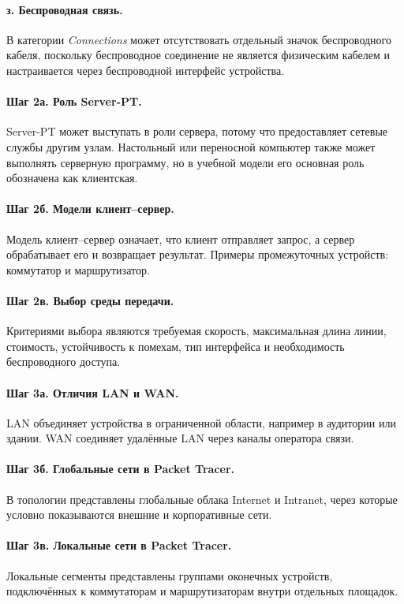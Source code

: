 \documentclass[a4paper,14pt,oneside]{extarticle}
\begin{document}
\paragraph{з. Беспроводная связь.}
В категории \textit{Connections} может отсутствовать отдельный значок
беспроводного кабеля, поскольку беспроводное соединение не является
физическим кабелем и настраивается через беспроводной интерфейс устройства.

\paragraph{Шаг 2а. Роль Server-PT.}
Server-PT может выступать в роли сервера, потому что предоставляет
сетевые службы другим узлам. Настольный или переносной компьютер также
может выполнять серверную программу, но в учебной модели его основная
роль обозначена как клиентская.

\paragraph{Шаг 2б. Модели клиент--сервер.}
Модель клиент--сервер означает, что клиент отправляет запрос, а сервер
обрабатывает его и возвращает результат. Примеры промежуточных устройств:
коммутатор и маршрутизатор.

\paragraph{Шаг 2в. Выбор среды передачи.}
Критериями выбора являются требуемая скорость, максимальная длина линии,
стоимость, устойчивость к помехам, тип интерфейса и необходимость
беспроводного доступа.

\paragraph{Шаг 3а. Отличия LAN и WAN.}
LAN объединяет устройства в ограниченной области, например в аудитории
или здании. WAN соединяет удалённые LAN через каналы оператора связи.

\paragraph{Шаг 3б. Глобальные сети в Packet Tracer.}
В топологии представлены глобальные облака Internet и Intranet, через
которые условно показываются внешние и корпоративные сети.

\paragraph{Шаг 3в. Локальные сети в Packet Tracer.}
Локальные сегменты представлены группами оконечных устройств,
подключённых к коммутаторам и маршрутизаторам внутри отдельных площадок.
\end{document}
